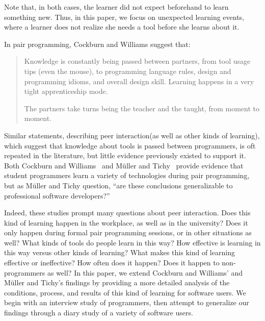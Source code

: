 \documentclass[smallextended]{svjour3}
\newcommand\discovery{peer interaction\xspace}
\begin{document}
\noindent
Note that, in both cases, the learner did not expect beforehand to 
learn something new.
Thus, in this paper, we focus on unexpected learning events, 
where a learner does not realize she needs a tool before she 
learns about it.

In pair programming, Cockburn and Williams suggest that:


\begin{quote} 
Knowledge is constantly being passed between
partners, from tool usage tips (even the mouse),
to programming language rules, design and
programming idioms, and overall design skill.
Learning happens in a very tight apprenticeship
mode. 

The partners take turns being the teacher
and the taught, from moment to moment.
\end{quote}

\noindent
Similar statements, describing \discovery (as well as other kinds of learning),
which suggest that knowledge about tools is passed between programmers, is oft
repeated in the literature, but little evidence previously existed to support
it. Both Cockburn and Williams~\cite{cockburn00} and M\"{u}ller and
Tichy~\cite{muller} provide evidence that student programmers learn a variety
of technologies during pair programming, but as M\"{u}ller and
Tichy question, ``are these conclusions generalizable to professional software
developers?''

Indeed, these studies prompt many questions about \discovery. 
Does this kind of learning happen in the workplace, as well as in
the university?
Does it only happen during formal pair programming sessions, or in other situations as well?
What kinds of tools do people learn in this way?
How effective is learning in this way versus other kinds of learning?
What makes this kind of learning effective or ineffective?
How often does it happen?
Does it happen to non-programmers as well?
In this paper, we extend Cockburn and Williams' and M\"{u}ller and
Tichy's findings by providing a more detailed analysis of
the conditions, process, and results of this kind of learning for
software users.
We begin with an interview study of programmers, then attempt to generalize
our findings through a diary study of a variety of software users.
\end{document}
